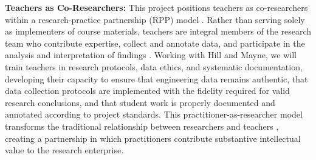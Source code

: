 \documentclass[11pt]{article}
\begin{document}
\textbf{Teachers as Co-Researchers:}
This project positions teachers as co-researchers within a research-practice partnership (RPP) model \cite{Coburn2013, conrad2015educating}.
Rather than serving solely as implementers of course materials, teachers are integral members of the research team who contribute expertise, collect and annotate data, and participate in the analysis and interpretation of findings \cite{Penuel2017}.
Working with Hill and Mayne, we will train teachers in research protocols, data ethics, and systematic documentation, developing their capacity to ensure that engineering data remains authentic, that data collection protocols are implemented with the fidelity required for valid research conclusions, and that student work is properly documented and annotated according to project standards.
This practitioner-as-researcher model transforms the traditional relationship between researchers and teachers \cite{CochranSmith2009}, creating a partnership in which practitioners contribute substantive intellectual value to the research enterprise. 
\end{document}
